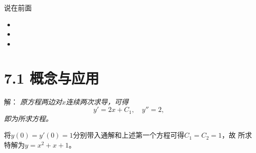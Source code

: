 
\titlepage

\begin{frame}{说在前面}
	\linespread{1.5}
	  \begin{itemize}[<+-|alert@+>]
	    \item {}
	    \item {}
	    \item {}
	  \end{itemize}
\end{frame}


\section{7.1 概念与应用}

\begin{frame}
	\linespread{1.5}
	
	\bigskip
	
	\small 解：\it
	原方程两边对$x$连续两次求导，可得
	$$y'=2x+C_1,\quad y''=2,$$
	即为所求方程。
	
	将$y(0)=y'(0)=1$分别带入通解和上述第一个方程可得$C_1=C_2=1$，故
	所求特解为$y=x^2+x+1$。
\end{frame}

